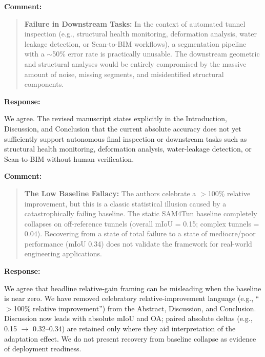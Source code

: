 \documentclass[11pt,a4paper]{article}
\newenvironment{commentblock}{%
  \par\smallskip\noindent\textbf{Comment:}\par
  \begin{quote}\itshape\color{black}
}{%
  \end{quote}\smallskip
}
\newenvironment{responseblock}{%
  \par\smallskip\noindent\textbf{Response:}\par
  \begingroup\color{responsegreen}
}{%
  \endgroup\smallskip
}
\begin{document}
\begin{commentblock}
\textbf{Failure in Downstream Tasks:} In the context of automated tunnel inspection (e.g., structural health monitoring, deformation analysis, water leakage detection, or Scan-to-BIM workflows), a segmentation pipeline with a $\sim$50\% error rate is practically unusable. The downstream geometric and structural analyses would be entirely compromised by the massive amount of noise, missing segments, and misidentified structural components.
\end{commentblock}
\begin{responseblock}
We agree. The revised manuscript states explicitly in the Introduction, Discussion, and Conclusion that the current absolute accuracy does not yet sufficiently support autonomous final inspection or downstream tasks such as structural health monitoring, deformation analysis, water-leakage detection, or Scan-to-BIM without human verification.
\end{responseblock}

\begin{commentblock}
\textbf{The Low Baseline Fallacy:} The authors celebrate a $>$100\% relative improvement, but this is a classic statistical illusion caused by a catastrophically failing baseline. The static SAM4Tun baseline completely collapses on off-reference tunnels (overall mIoU = 0.15; complex tunnels = 0.04). Recovering from a state of total failure to a state of mediocre/poor performance (mIoU 0.34) does not validate the framework for real-world engineering applications.
\end{commentblock}
\begin{responseblock}
We agree that headline relative-gain framing can be misleading when the baseline is near zero. We have removed celebratory relative-improvement language (e.g., ``$>$100\% relative improvement'') from the Abstract, Discussion, and Conclusion. Discussion now leads with absolute mIoU and OA; paired absolute deltas (e.g., 0.15 $\rightarrow$ 0.32--0.34) are retained only where they aid interpretation of the adaptation effect. We do not present recovery from baseline collapse as evidence of deployment readiness.
\end{responseblock}
\end{document}
